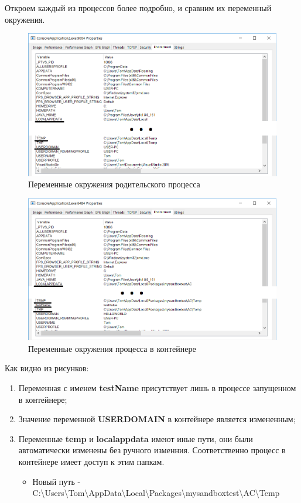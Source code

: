 Откроем каждый из процессов более подробно, и сравним их переменный окружения.
\begin{figure}[H]
  \centering
  \includegraphics[width=\textwidth]{img/2}
  \caption{Переменные окружения родительского процесса}
\end{figure}
\begin{figure}[H]
  \centering
  \includegraphics[width=\textwidth]{img/3}
  \caption{Переменные окружения процесса в контейнере}
\end{figure}
Как видно из рисунков:
\begin{enumerate}
\item Переменная с именем \textbf{testName} присутствует лишь в процессе запущенном в контейнере;
\item Значение переменной \textbf{USERDOMAIN} в контейнере является измененным;
\item Переменные \textbf{temp} и \textbf{localappdata} имеют иные пути, они были автоматически изменены без ручного изменния. Соответственно процесс в контейнере имеет доступ к этим папкам.
\begin{itemize}
\item Новый путь - C:\textbackslash Users\textbackslash Tom\textbackslash AppData\textbackslash Local\textbackslash Packages\textbackslash mysandboxtest\textbackslash AC\textbackslash Temp
\end{itemize}
\end{enumerate}



